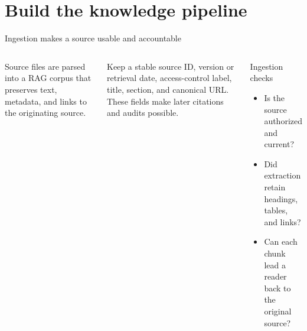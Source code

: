 \documentclass[aspectratio=169]{beamer}
\newcommand{\visualdescription}[1]{\par\vspace{.2em}\noindent\parbox{\linewidth}{\centering\tiny\color{sourcegray}#1}}
\begin{document}
\section{Build the knowledge pipeline}
\begin{frame}{Ingestion makes a source usable and accountable}
\small
\begin{columns}[c]
\visualdescription{Source files are parsed into a RAG corpus that preserves text, metadata, and links to the originating source.}
\par\vspace{.8em}\footnotesize\raggedright Keep a stable source ID, version or retrieval date, access-control label, title, section, and canonical URL. These fields make later citations and audits possible.
\begin{block}{Ingestion checks}
\begin{itemize}\itemsep.25em
\item Is the source authorized and current?
\item Did extraction retain headings, tables, and links?
\item Can each chunk lead a reader back to the original source?
\end{itemize}
\end{block}
\end{columns}
\end{frame}
\end{document}
